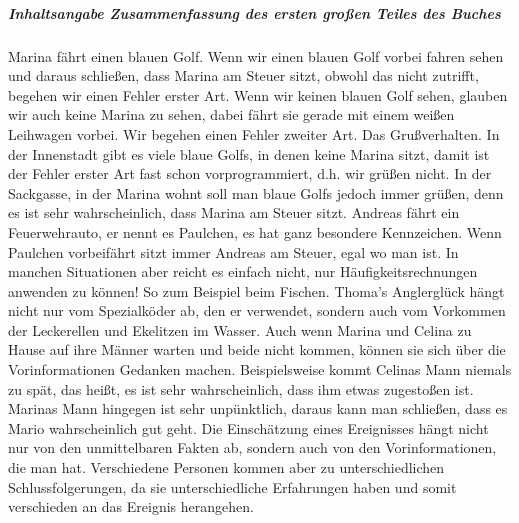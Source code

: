 \documentclass{article}
\begin{document}
	\subparagraph {\Huge Inhaltsangabe \newline
	\small Zusammenfassung des ersten gro{\ss}en Teiles des Buches}
	\begin{flushleft}
	\begin{text}	\newline
	Marina f\"{a}hrt einen blauen Golf. Wenn wir einen blauen Golf vorbei fahren sehen und daraus schlie{\ss}en, dass 			Marina am Steuer sitzt, obwohl das nicht zutrifft, begehen wir einen Fehler erster Art.\newline
	Wenn wir keinen blauen Golf sehen, glauben wir auch keine Marina zu sehen, dabei f\"{a}hrt sie gerade mit einem 				wei{\ss}en Leihwagen vorbei. Wir begehen einen Fehler zweiter Art.\newline
	Das Gru{\ss}verhalten.\newline
	In der Innenstadt gibt es viele blaue Golfs, in denen keine Marina sitzt, damit ist der Fehler erster Art fast schon 		vorprogrammiert, d.h. wir gr\"{u}{\ss}en nicht. \newline
	In der Sackgasse, in der Marina wohnt soll man blaue Golfs jedoch immer gr\"{u}{\ss}en, denn es ist sehr 								wahrscheinlich, dass Marina am Steuer sitzt. \newline
	Andreas f\"{a}hrt ein Feuerwehrauto, er nennt es Paulchen, es hat ganz besondere Kennzeichen. Wenn Paulchen 						vorbeif\"{a}hrt sitzt immer Andreas am Steuer, egal wo man ist. \newline
	\newline
In manchen Situationen aber reicht es einfach nicht, nur H\"{a}ufigkeitsrechnungen anwenden zu k\"{o}nnen! So zum Beispiel beim Fischen. \newline
Thoma's Anglergl\"{u}ck h\"{a}ngt nicht nur vom Spezialk\"{o}der ab, den er verwendet, sondern auch vom Vorkommen der Leckerellen und Ekelitzen im Wasser. \newline
Auch wenn Marina und Celina zu Hause auf ihre M\"{a}nner warten und beide nicht kommen, k\"{o}nnen sie sich \"{u}ber die Vorinformationen Gedanken machen. Beispielsweise kommt Celinas Mann niemals zu sp\"{a}t, das hei{\ss}t, es ist sehr wahrscheinlich, dass ihm etwas zugesto{\ss}en ist. Marinas Mann hingegen ist sehr unp\"{u}nktlich, daraus kann man schlie{\ss}en, dass es Mario wahrscheinlich gut geht.\newline
Die Einsch\"{a}tzung eines Ereignisses h\"{a}ngt nicht nur von den unmittelbaren Fakten ab, sondern auch von den Vorinformationen, die man hat. Verschiedene Personen kommen aber zu unterschiedlichen Schlussfolgerungen, da sie unterschiedliche Erfahrungen haben und somit verschieden an das Ereignis herangehen.
\end{text}
\end{flushleft}
\newpage
\end{document}
